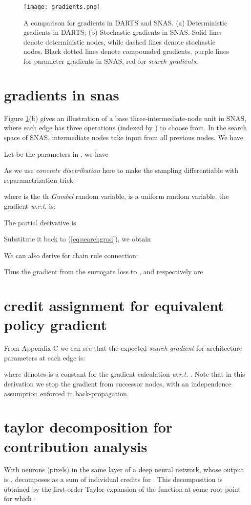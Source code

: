 \documentclass{article} \usepackage{iclr2019_conference,times}
\newcommand{\zh}{\color{black}}
\begin{document}
\begin{figure}[h]
  \centering
  \texttt{[image: gradients.png]}
  \caption{A comparison for gradients in DARTS and SNAS. (a) Deterministic gradients in DARTS; (b) Stochastic gradients in SNAS. Solid lines denote deterministic nodes, while dashed lines denote stochastic nodes. Black {\zh dotted} lines denote compounded gradients, purple lines for parameter gradients in SNAS, red for \textit{search gradients}. }
  \label{fig:snas_vs_darts}
\end{figure}

\section{gradients in snas}
Figure \ref{fig:snas_vs_darts}(b) gives an illustration of a base three-intermediate-node unit in SNAS, where each edge has three operations (indexed by ) to choose from. In the search space of SNAS, intermediate nodes take input from all previous nodes. We have 

Let  be the parameters in , we have 


As we use \textit{concrete disctribution} here to make the sampling differentiable with reparametrization trick:

where  is the th \textit{Gumbel} random variable,  is a uniform random variable, the gradient \textit{w.r.t.}  is:

The partial derivative  is

Substitute it back to (\ref{eq:searchgrad}), we obtain

We can also derive  for chain rule connection:

Thus the gradient from the surrogate loss  to ,  and  respectively are






\section{credit assignment for equivalent policy gradient}
From Appendix C we can see that the expected \textit{search gradient} for architecture parameters at each edge is:

where  denotes  is a constant for the gradient calculation \textit{w.r.t.} . Note that in this derivation we stop the gradient from successor nodes, with an independence assumption enforced in back-propagation. 

\section{taylor decomposition for {\zh contribution} analysis}
With  neurons (pixels)  in the same layer of a deep neural network, whose output is , \citet{montavon2017explaining} decomposes  as a sum of individual credits for . This decomposition is obtained by the first-order Taylor expansion of the function at some root point  for which : 
\end{document}
